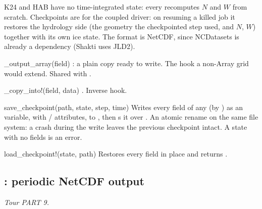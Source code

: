 K24 and HAB have no time-integrated state: every  recomputes $N$ and $W$ from scratch. Checkpoints are for the
coupled driver: on resuming a killed job it restores the hydrology side (the geometry the checkpointed step used, and
$N$, $W$) together with its own ice state. The format is NetCDF, since NCDatasets is already a dependency (Shakti uses
JLD2).
\begin{fnlist}
\item[\_output\_array(field)] : a plain copy ready to write. The hook a non-Array grid would extend. Shared with
  .
\item[\_copy\_into!(field, data)] . Inverse hook.
\item[save\_checkpoint(path, state, step, time)] Writes every field of any  (by ) as an
    variable, with / attributes, to , then s it over . An atomic
  rename on the same file system: a crash during the write leaves the previous checkpoint intact. A state with no fields
  is an error.
\item[load\_checkpoint!(state, path)] Restores every field in place and returns .
\end{fnlist}

\subsection{: periodic NetCDF output}\label{ref:output}
\emph{Tour PART 9.}

